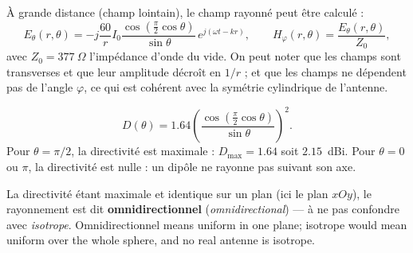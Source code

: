 À grande distance (champ lointain), le champ rayonné peut être calculé :
\[ E_\theta(r,\theta) = -j \frac{60}{r} I_0
     \frac{\cos\left(\frac{\pi}{2}\cos\theta\right)}{\sin\theta}\,
     e^{j(\omega t - kr)},
   \qquad H_\varphi(r,\theta) = \frac{E_\theta(r,\theta)}{Z_0}, \]
avec $Z_0 = 377\ \Omega$ l'impédance d'onde du vide. On peut noter que les
champs sont transverses et que leur amplitude décroît en $1/r$ ; et que les
champs ne dépendent pas de l'angle $\varphi$, ce qui est cohérent avec la
symétrie cylindrique de l'antenne.

\begin{prop}
  \[ D(\theta) = 1.64 \left(\frac{\cos\left(\frac{\pi}{2}\cos\theta\right)}{\sin\theta}\right)^{2}. \]
  Pour $\theta = \pi/2$, la directivité est maximale :
  $D_{\max} = 1.64$ soit $2.15$~dBi. Pour $\theta = 0$ ou $\pi$, la directivité
  est nulle : un dipôle ne rayonne pas suivant son axe.
\end{prop}

\begin{remark}
  La directivité étant maximale et identique sur un plan (ici le plan $xOy$),
  le rayonnement est dit \textbf{omnidirectionnel} (\textit{omnidirectional})
  --- à ne pas confondre avec \emph{isotrope}. Omnidirectionnel means uniform
  in one plane; isotrope would mean uniform over the whole sphere, and no real
  antenne is isotrope.
\end{remark}

